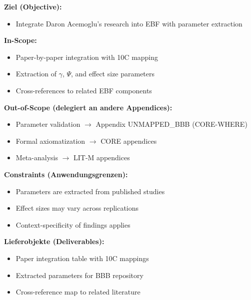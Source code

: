 
\begin{tcolorbox}[
    colback=orange!5!white,
    colframe=orange!75!black,
    title={\textbf{Appendix Scope: Ziel / In-Scope / Out-of-Scope / Constraints}},
    fonttitle=\bfseries
]

\textbf{Ziel (Objective):}
\begin{itemize}[nosep]
    \item Integrate Daron Acemoglu's research into EBF with parameter extraction
\end{itemize}

\textbf{In-Scope:}
\begin{itemize}[nosep]
    \item Paper-by-paper integration with 10C mapping
    \item Extraction of $\gamma$, $\Psi$, and effect size parameters
    \item Cross-references to related EBF components
\end{itemize}

\textbf{Out-of-Scope (delegiert an andere Appendices):}
\begin{itemize}[nosep]
    \item Parameter validation $\rightarrow$ Appendix UNMAPPED_BBB (CORE-WHERE)
    \item Formal axiomatization $\rightarrow$ CORE appendices
    \item Meta-analysis $\rightarrow$ LIT-M appendices
\end{itemize}

\textbf{Constraints (Anwendungsgrenzen):}
\begin{itemize}[nosep]
    \item Parameters are extracted from published studies
    \item Effect sizes may vary across replications
    \item Context-specificity of findings applies
\end{itemize}

\textbf{Lieferobjekte (Deliverables):}
\begin{itemize}[nosep]
    \item Paper integration table with 10C mappings
    \item Extracted parameters for BBB repository
    \item Cross-reference map to related literature
\end{itemize}

\end{tcolorbox}

